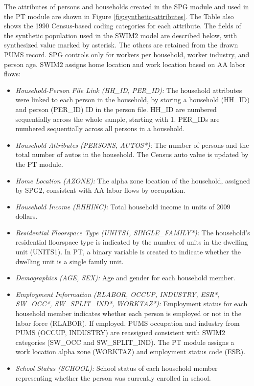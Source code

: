 The attributes of persons and households created in the SPG module and used in the PT module are shown in Figure \ref{fig:synthetic-attributes}. The Table also shows the 1990 Census-based coding categories for each attribute. The fields of the synthetic population used in the SWIM2 model are described below, with synthesized value marked by asterisk. The others are retained from the drawn PUMS record. SPG controls only for workers per household, worker industry, and person age. SWIM2 assigns home location and work location based on AA labor flows:
\begin{itemize}
\item \textit{Household-Person File Link (HH\_ID, PER\_ID):} The household attributes were linked to each person in the household, by storing a household (HH\_ID) and person (PER\_ID) ID in the person file. HH\_ID are numbered sequentially across the whole sample, starting with 1. PER\_IDs are numbered sequentially across all persons in a household. 
\item \textit{Household Attributes (PERSONS, AUTOS*):} The number of persons and the total number of autos in the household. The Census auto value is updated by the PT module.
\item \textit{Home Location (AZONE):} The alpha zone location of the household, assigned by SPG2, consistent with AA labor flows by occupation. 
\item \textit{Household Income (RHHINC):} Total household income in units of 2009 dollars.
\item \textit{Residential Floorspace Type (UNITS1, SINGLE\_FAMILY*):} The household's residential floor\-space type is indicated by the number of units in the dwelling unit (UNITS1). In PT, a binary variable is created to indicate whether the dwelling unit is a single family unit. 
\item \textit{Demographics (AGE, SEX):} Age and gender for each household member.
\item \textit{Employment Information (RLABOR, OCCUP, INDUSTRY, ESR*, SW\_OCC*, SW\_SPLIT\_IND*, WORKTAZ*):} Employment status for each household member indicates whether each person is employed or not in the labor force (RLABOR). If employed, PUMS occupation and industry from PUMS (OCCUP, INDUSTRY) are reassigned consistent with SWIM2 categories (SW\_OCC and SW\_SPLIT\_IND). The PT module assigns a work location alpha zone (WORKTAZ) and employment status code (ESR).
\item \textit{School Status (SCHOOL):} School status of each household member representing whether the person was currently enrolled in school.
\end{itemize}

